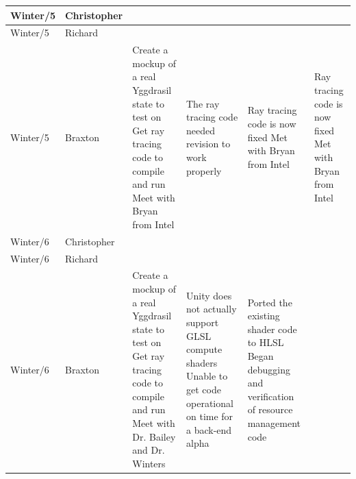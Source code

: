 \documentclass[onecolumn, draftclsnofoot,10pt, compsoc]{IEEEtran}
\begin{document}
\begin{tiny}
\begin{longtable}{ | p{} | p{} | p{} | p{} | p{} | p{} | }
\\ \hline
Winter/5 & Christopher & 

&

&

&

\\ \hline
Winter/5 & Richard & 

&

&

&

\\ \hline
Winter/5 & Braxton & 

Create a mockup of a real Yggdrasil state to test on \newline
Get ray tracing code to compile and run \newline
Meet with Bryan from Intel 

&

The ray tracing code needed revision to work properly 

&

Ray tracing code is now fixed \newline
Met with Bryan from Intel 

&

Ray tracing code is now fixed \newline
Met with Bryan from Intel 

\\ \hline
Winter/6 & Christopher & 

&

&

&

\\ \hline
Winter/6 & Richard & 

&

&

&

\\ \hline
Winter/6 & Braxton & 

Create a mockup of a real Yggdrasil state to test on \newline
Get ray tracing code to compile and run \newline
Meet with Dr. Bailey and Dr. Winters 

&

Unity does not actually support GLSL compute shaders \newline
Unable to get code operational on time for a back-end alpha 

&

Ported the existing shader code to HLSL \newline
Began debugging and verification of resource management code 


\end{longtable}
\end{tiny}
\end{document}
